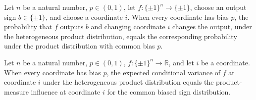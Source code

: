 \begin{theorem}
\label{FABL.heterogeneousOutputPivotalProbability_const}
\leanok
{}
Let $n$ be a natural number, $p\in(0,1)$, let $f:\{\pm1\}^n\to\{\pm1\}$, choose an
output sign $b\in\{\pm1\}$, and choose a coordinate $i$. When every coordinate has bias
$p$, the probability that $f$ outputs $b$ and changing coordinate $i$ changes the
output, under the heterogeneous product distribution, equals the corresponding
probability under the product distribution with common bias $p$.
\end{theorem}

\begin{theorem}
\label{FABL.heterogeneousBiasedInfluence_const}
\leanok
{}
Let $n$ be a natural number, $p\in(0,1)$, $f:\{\pm1\}^n\to\mathbb R$, and let $i$ be a
coordinate. When every coordinate has bias $p$, the expected conditional variance of $f$
at coordinate $i$ under the heterogeneous product distribution equals the
product-measure influence at coordinate $i$ for the common biased sign distribution.
\end{theorem}

